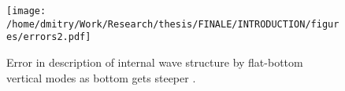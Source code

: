 \documentclass[12pt]{article}
\begin{document}
\begin{figure}
	\texttt{[image: /home/dmitry/Work/Research/thesis/FINALE/INTRODUCTION/figures/errors2.pdf]}
	\caption{Error in description of internal wave structure by flat-bottom vertical modes as 
	bottom gets steeper \citep{wunsch1968propagation}.}
\end{figure}
% 
%
\end{document}
